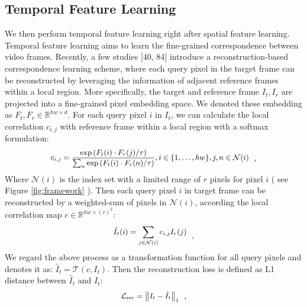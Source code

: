 \documentclass{article}
\begin{document}
\subsection{Temporal Feature Learning}
\label{temporal_feature_learning}
We then perform temporal feature learning right after spatial feature learning. Temporal feature learning aims to learn the fine-grained correspondence between video frames. Recently, a few studies [40, 84] introduce a reconstruction-based correspondence learning scheme, where each query pixel in the target frame can be reconstructed by leveraging the information of adjacent reference frames within a local region. More specifically, the target and reference frame $I_{t}, I_r$ are projected into a  fine-grained pixel embedding space. We denoted these embedding as $F_t,F_{r} \in \mathbb{R}^{hw \times d}$. For each query pixel $i$ in $I_{t}$, we can calculate the local correlation $c_{i,j}$ with reference frame within a local region with a softmax formulation:
\begin{equation}\label{eq:local_correlation}
  \small
  \begin{aligned}
    c_{i, j}=\frac{\exp \left(F_t(i)  \cdot F_r(j) / \tau\right)}{\sum_{n} \exp \left(F_t(i) \cdot F_r(n) / \tau\right)}, i \in \{1,\ldots,hw\}, j,n \in \mathcal{N}(i)
  \end{aligned}~~,
\end{equation}
Where $\mathcal{N}(i)$ is the index set with a limited range of $r$ pixels for pixel $i$ ( see Figure \ref{fig:framework} ). Then each query pixel $i$ in target frame can be reconstructed by a weighted-sum of pixels in $\mathcal{N}(i)$, according the local correlation map $c \in \mathbb{R}^{hw \times (r)^2}$:
\begin{equation}\label{eq:reconstruction}
  \small
  \begin{aligned}
    \hat{I}_{t}(i)=\sum_{j \in \mathcal{N}(i)} c_{i,j} I_{r}(j)
  \end{aligned}~~,
\end{equation}
We regard the above process as a transformation function for all query pixels and denotes it as: $\hat{I}_{t} = \mathcal{T}\left(c, I_t\right)$. Then the reconstruction loss is defined as L1 distance between $\hat{I}_{t}$ and $I_{t}$:
\begin{equation}\label{eq:reconstruction loss}
  \small
  \begin{aligned}
    \mathcal{L}_{\mathrm{rec}}=\left\|I_{t}-\hat{I}_{t}\right\|_{1}
  \end{aligned}~~,
\end{equation}
\end{document}
